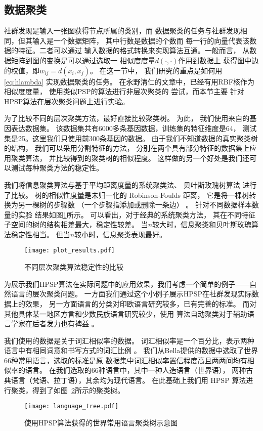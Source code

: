 \subsection{数据聚类}
\label{sec:data_clustering}
社群发现是输入一张图获得节点所属的类别，而
数据聚类的任务与社群发现相同，但其输入是一个数据矩阵，
其中行数是数据的个数而
每一行的向量代表该数据的特征。二者可以通过
输入数据的格式转换来实现算法互通。一般而言，
从数据矩阵到图的变换是可以通过选取一
相似度度量$d(\cdot,\cdot)$作用到数据上
获得图中边的权值，即$w_{ij}=d(x_i, x_j)$。
在这一节中，
我们研究的重点是如何用
\eqref{eq:hlambda} 实现数据聚类的任务。
在永野清仁的文章中\cite{mac}，已经有用RBF核作为相似度度量，
使用类似PSP的算法进行非层次聚类的
尝试，而本节主要
针对HPSP算法在层次聚类问题上进行实验。

为了比较不同的层次聚类方法，最好直接比较聚类树。
为此，
我们使用来自\citet{khan2001classification}的基因表达数据集。
该数据集共有6000多条基因数据，训练集的特征维度是64，
测试集是25。这里我们只使用前300条基因的数据。
由于我们不知道数据的真实聚类树的结构，
我们可以采用分割特征的方法，
分别在两个具有部分特征的数据集上应用聚类算法，
并比较得到的聚类树的相似程度。
这样做的另一个好处是我们还可以测试每种聚类方法的稳定性。

我们将信息聚类算法与基于平均距离度量的系统聚类法、
贝叶斯玫瑰树算法
\cite{blundell2011discovering}
进行了比较。
树的相似性度量是未归一化的 Robinson-Foulds 距离，
它是将一棵树转换为另一棵树的步骤数
（一个步骤指添加或删除一条边）
\citep{day1985optimal}。
针对不同数据样本数量的实验
结果如图\ref{fig:shc}所示。
可以看出，对于经典的系统聚类方法，
其在不同特征子空间的树的结构相差最大，稳定性较差。
当$n$较大时，信息聚类和贝叶斯玫瑰算法稳定性相当。
但当$n$较小时，信息聚类表现最好。

\begin{figure}[!ht]
\centering
\texttt{[image: plot\_results.pdf]}
\caption{不同层次聚类算法稳定性的比较}\label{fig:shc}
\end{figure}

为展示我们HPSP算法在实际问题中的应用效果，我们考虑一个简单的例子——自然语言的层次聚类问题。
一方面我们通过这个小例子展示HPSP在社群发现实际数据上的效果，
另一方面语言的分类对印欧语言研究较多，已有完善的标准。 
而对其他具体某一地区方言和少数民族语言研究较少，使用
算法自动聚类对于辅助语言学家在后者发力也有裨益 \cite{nasution2019visualizing}。

我们使用的数据是关于词汇相似率的数据。
词汇相似率是一个百分比，表示两种语言中有相同词意和书写方式的词汇比例
\cite{bella2021database}。
我们从Bella提供的数据中选取了世界66种常用语言，选取的标准是原
数据集中词汇相似率置信程度高且两两间均有相似率的语言。
在我们选取的66种语言中，其中一种人造语言（世界语），
两种古典语言（梵语、拉丁语），其余均为现代语言。
在此基础上我们用 HPSP 算法进行聚类，得到了如图~\ref{fig:language_tree}所示的聚类树。
\begin{figure}[!ht]
    \centering
    \texttt{[image: language\_tree.pdf]}
    \caption{使用HPSP算法获得的世界常用语言聚类树示意图}\label{fig:language_tree}
\end{figure}

